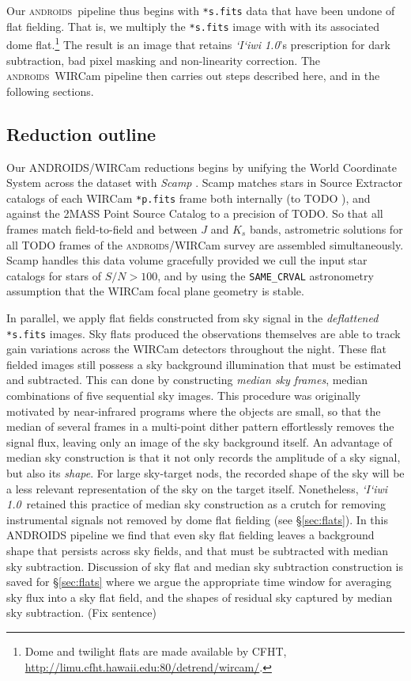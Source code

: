 \documentclass[iop]{emulateapj}
\newcommand{\sw}[1]{\textit{#1}} %
\newcommand{\iiwione}{\sw{`I`iwi 1.0}}
\newcommand{\androids}{\textsc{androids}}
\newcommand{\todo}[1]{\textcolor{BurntOrange}{\textsf{#1}}} %
\newcommand{\Sec}[1]{\S\ref{sec:#1}}  %
\begin{document}
\vspace{1em}

Our \androids\ pipeline thus begins with \texttt{*s.fits} data that have been undone of flat fielding.
That is, we multiply the \texttt{*s.fits} image with with its associated dome flat.\footnote{Dome and twilight flats are made available by CFHT, \url{http://limu.cfht.hawaii.edu:80/detrend/wircam/}.}
The result is an image that retains \iiwione's prescription for dark subtraction, bad pixel masking and non-linearity correction.
The \androids\ WIRCam pipeline then carries out steps described here, and in the following sections.

\subsection{Reduction outline}
\label{sec:reduction_outline}

Our ANDROIDS/WIRCam reductions begins by unifying the World Coordinate System across the dataset with \sw{Scamp} \citep{Bertin:2006}.
Scamp matches stars in Source Extractor \citep{Bertin:1996} catalogs of each WIRCam \texttt{*p.fits} frame both internally (to \todo{TODO} \arcsec ), and against the 2MASS Point Source Catalog \citep{Skrutskie:2006} to a precision of \todo{TODO}\arcsec.
So that all frames match field-to-field and between $J$ and $K_s$ bands, astrometric solutions for all \todo{TODO} frames of the \androids /WIRCam survey are assembled simultaneously.  Scamp handles this data volume gracefully provided we cull the input star catalogs for stars of $S/N > 100$, and by using the \texttt{SAME\_CRVAL} astronometry assumption that the WIRCam focal plane geometry is stable.

In parallel, we apply flat fields constructed from sky signal in the \textit{deflattened} \texttt{*s.fits} images.
Sky flats produced the observations themselves are able to track gain variations across the WIRCam detectors throughout the night.
These flat fielded images still possess a sky background illumination that must be estimated and subtracted.
This can done by constructing \textit{median sky frames}, median combinations of five sequential sky 
images.
This procedure was originally motivated by near-infrared programs where the objects are small, so that the median of several frames in a multi-point dither pattern effortlessly removes the signal flux, leaving only an image of the sky background itself.
An advantage of median sky construction is that it not only records the amplitude of a sky signal, but also its \emph{shape}.
For large sky-target nods, the recorded shape of the sky will be a less relevant representation of the sky on the target itself.
Nonetheless, \iiwione\ retained this practice of median sky construction as a crutch for removing instrumental signals not removed by dome flat fielding (see \Sec{flats}). In this ANDROIDS pipeline we find that even sky flat fielding leaves a background shape that persists across sky fields, and that must be subtracted with median sky subtraction.
Discussion of sky flat and median sky subtraction construction is saved for \Sec{flats} where we argue the appropriate time window for averaging sky flux into a sky flat field, and the shapes of residual sky captured by median sky subtraction. \todo{(Fix sentence)}
\end{document}

